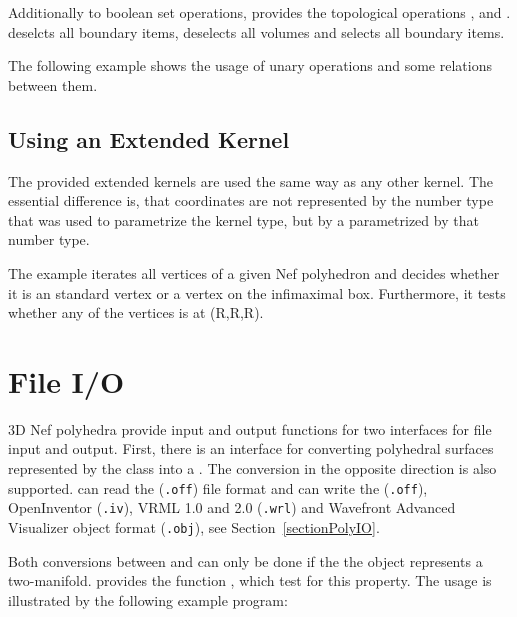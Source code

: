 Additionally to boolean set operations,  provides
the topological operations ,  and 
.  deselcts all boundary items, 
 deselects all volumes and  selects all
boundary items. 

The following example shows the usage of unary operations and some relations 
between them.


\subsection{Using an Extended Kernel}

The provided extended kernels are used the same way as any other \cgal kernel.
The essential difference is, that coordinates are not represented by the number
type that was used to parametrize the kernel type, but by a 
parametrized by that number type.

The example iterates all vertices of a given Nef polyhedron and decides whether
it is an standard vertex or a vertex on the infimaximal box. Furthermore, it 
tests whether any of the vertices is at (R,R,R). 


\section{File I/O}
\label{sectionNef_3IO}

3D Nef polyhedra provide input and output functions for two interfaces for file
input and output. First, there is an interface for converting polyhedral surfaces
represented by the \cgal class  into a . The 
conversion in the opposite direction is also supported.  can read
the ({\tt .off}) file format and can write the ({\tt .off}),
OpenInventor ({\tt .iv}), VRML 1.0 and 2.0 ({\tt .wrl}) and Wavefront Advanced
Visualizer object format ({\tt .obj}), see Section~\ref{sectionPolyIO}.
 
Both conversions between  and  can only 
be done if the the object represents a two-manifold. 
provides the function , which test for this property. The
usage is illustrated by the following example program:


